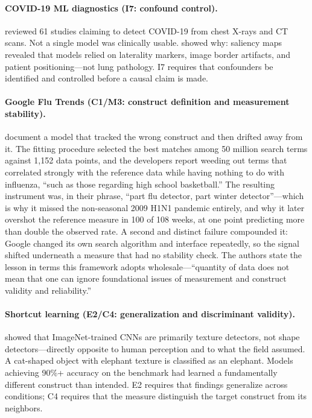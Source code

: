 \documentclass{article}
\begin{document}
\paragraph{COVID-19 ML diagnostics (I7: confound control).}
\citet{roberts2021common} reviewed 61 studies claiming to detect COVID-19 from chest X-rays and CT scans. Not a single model was clinically usable. \citet{degrave2021ai} showed why: saliency maps revealed that models relied on laterality markers, image border artifacts, and patient positioning---not lung pathology. I7 requires that confounders be identified and controlled before a causal claim is made.

\paragraph{Google Flu Trends (C1/M3: construct definition and measurement stability).}
\citet{lazer2014parable} document a model that tracked the wrong construct and then drifted away from it. The fitting procedure selected the best matches among 50 million search terms against 1{,}152 data points, and the developers report weeding out terms that correlated strongly with the reference data while having nothing to do with influenza, ``such as those regarding high school basketball.'' The resulting instrument was, in their phrase, ``part flu detector, part winter detector''---which is why it missed the non-seasonal 2009 H1N1 pandemic entirely, and why it later overshot the reference measure in 100 of 108 weeks, at one point predicting more than double the observed rate. A second and distinct failure compounded it: Google changed its own search algorithm and interface repeatedly, so the signal shifted underneath a measure that had no stability check. The authors state the lesson in terms this framework adopts wholesale---``quantity of data does not mean that one can ignore foundational issues of measurement and construct validity and reliability.''

\paragraph{Shortcut learning (E2/C4: generalization and discriminant validity).}
\citet{geirhos2019imagenet} showed that ImageNet-trained CNNs are primarily texture detectors, not shape detectors---directly opposite to human perception and to what the field assumed. A cat-shaped object with elephant texture is classified as an elephant. Models achieving 90\%+ accuracy on the benchmark had learned a fundamentally different construct than intended. E2 requires that findings generalize across conditions; C4 requires that the measure distinguish the target construct from its neighbors.
\end{document}
